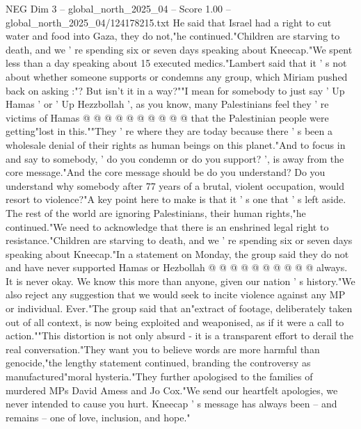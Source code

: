 \begin{textsample}{NEG Dim 3 – global\_north\_2025\_04 – Score 1.00 – global\_north\_2025\_04/124178215.txt}
He said that Israel had a right to cut water and food into Gaza, they do not,"he continued."Children are starving to death, and we ' re spending six or seven days speaking about Kneecap."We spent less than a day speaking about 15 executed medics."Lambert said that it ' s not about whether someone supports or condemns any group, which Miriam pushed back on asking :"?
But isn't it in a way?""I mean for somebody to just say ' Up Hamas ' or ' Up Hezzbollah ', as you know, many Palestinians feel they ' re victims of Hamas @ @ @ @ @ @ @ @ @ @ that the Palestinian people were getting"lost in this.""They ' re where they are today because there ' s been a wholesale denial of their rights as human beings on this planet."And to focus in and say to somebody, ' do you condemn or do you support? ', is away from the core message."And the core message should be do you understand?
Do you understand why somebody after 77 years of a brutal, violent occupation, would resort to violence?"A key point here to make is that it ' s one that ' s left aside.
The rest of the world are ignoring Palestinians, their human rights,"he continued."We need to acknowledge that there is an enshrined legal right to resistance."Children are starving to death, and we ' re spending six or seven days speaking about Kneecap."In a statement on Monday, the group said they do not and have never supported Hamas or Hezbollah @ @ @ @ @ @ @ @ @ @ always.
It is never okay.
We know this more than anyone, given our nation ' s history."We also reject any suggestion that we would seek to incite violence against any MP or individual.
Ever."The group said that an"extract of footage, deliberately taken out of all context, is now being exploited and weaponised, as if it were a call to action.""This distortion is not only absurd - it is a transparent effort to derail the real conversation."They want you to believe words are more harmful than genocide,"the lengthy statement continued, branding the controversy as manufactured"moral hysteria."They further apologised to the families of murdered MPs David Amess and Jo Cox."We send our heartfelt apologies, we never intended to cause you hurt.
Kneecap ' s message has always been -- and remains -- one of love, inclusion, and hope."

\end{textsample}
